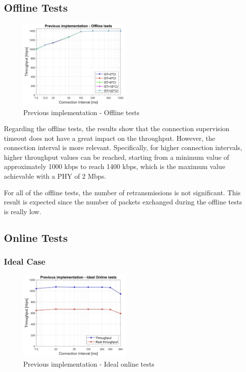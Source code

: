 \documentclass{Configuration_Files/PoliMi3i_thesis}
\begin{document}
\subsection*{Offline Tests}

\begin{figure}[H]
    \centering
    \includegraphics[width=0.5\textwidth]{Results Manuel/figure1}
    \caption{Previous implementation - Offline tests}
    \label{manuel_results_1}
\end{figure}

Regarding the offline tests, the results show that the connection supervision timeout does not have a great impact on the throughput. However, the connection interval is more relevant. Specifically, for higher connection intervals, higher throughput values can be reached, starting from a minimum value of approximately 1000 kbps to reach 1400 kbps, which is the maximum value achievable with a PHY of 2 Mbps.

For all of the offline tests, the number of retransmissions is not significant. This result is expected since the number of packets exchanged during the offline tests is really low.

\subsection*{Online Tests}

\subsubsection*{Ideal Case}

\begin{figure}[H]
    \centering
    \includegraphics[width=0.5\textwidth]{Results Manuel/figure2}
    \caption{Previous implementation - Ideal online tests}
    \label{manuel_results_2}
\end{figure}
\end{document}
